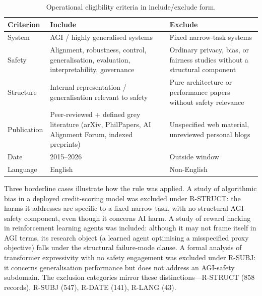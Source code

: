 \begin{table}[htbp]
\centering
\caption{Operational eligibility criteria in include/exclude form.}
\label{tab:eligibility}
\begin{tabular}{p{2.2cm} p{5.6cm} p{5.6cm}}
\toprule
Criterion & Include & Exclude \\
\midrule
System & AGI / highly generalised systems & Fixed narrow-task systems \\
Safety & Alignment, robustness, control, generalisation, evaluation, interpretability, governance & Ordinary privacy, bias, or fairness studies without a structural component \\
Structure & Internal representation / generalisation relevant to safety & Pure architecture or performance papers without safety relevance \\
Publication & Peer-reviewed + defined grey literature (arXiv, PhilPapers, AI Alignment Forum, indexed preprints) & Unspecified web material, unreviewed personal blogs \\
Date & 2015--2026 & Outside window \\
Language & English & Non-English \\
\bottomrule
\end{tabular}
\end{table}

Three borderline cases illustrate how the rule was applied. A study of algorithmic bias in a deployed credit-scoring model was excluded under R-STRUCT: the harms it addresses are specific to a fixed narrow task, with no structural AGI-safety component, even though it concerns AI harm. A study of reward hacking in reinforcement learning agents was included: although it may not frame itself in AGI terms, its research object (a learned agent optimising a misspecified proxy objective) falls under the structural failure-mode clause. A formal analysis of transformer expressivity with no safety engagement was excluded under R-SUBJ: it concerns generalisation performance but does not address an AGI-safety subdomain. The exclusion categories mirror these distinctions---R-STRUCT (858 records), R-SUBJ (547), R-DATE (141), R-LANG (43).

